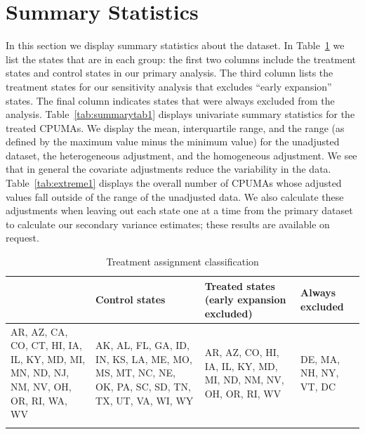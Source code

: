 \section{Summary Statistics}\label{app:sumstats}

In this section we display summary statistics about the dataset. In Table~\ref{tab:txassign} we list the states that are in each group: the first two columns include the treatment states and control states in our primary analysis. The third column lists the treatment states for our sensitivity analysis that excludes ``early expansion'' states. The final column indicates states that were always excluded from the analysis. Table~\ref{tab:summarytab1} displays univariate summary statistics for the treated CPUMAs. We display the mean, interquartile range, and the range (as defined by the maximum value minus the minimum value) for the unadjusted dataset, the heterogeneous adjustment, and the homogeneous adjustment. We see that in general the covariate adjustments reduce the variability in the data. Table~\ref{tab:extreme1} displays the overall number of CPUMAs whose adjusted values fall outside of the range of the unadjusted data. We also calculate these adjustments when leaving out each state one at a time from the primary dataset to calculate our secondary variance estimates; these results are available on request. 


\begin{table}[h!]
\centering
\caption{Treatment assignment classification}\label{tab:txassign}
\begin{tabular}{llll}
\begin{tabularx}{\textwidth}{|X|X|X|X|}
  \hline
Treated states & Control states & Treated states (early expansion excluded) & Always excluded \\
  \hline
AR, AZ, CA, CO, CT, HI, IA, IL, KY, MD, MI, MN, ND, NJ, NM, NV, OH, OR, RI, WA, WV & AK, AL, FL, GA, ID, IN, KS, LA, ME, MO, MS, MT, NC, NE, OK, PA, SC, SD, TN, TX, UT, VA, WI, WY & AR, AZ, CO, HI, IA, IL, KY, MD, MI, ND, NM, NV, OH, OR, RI, WV & DE, MA, NH, NY, VT, DC \\ 
   \hline
\end{tabularx}
\end{tabular}
\end{table}

